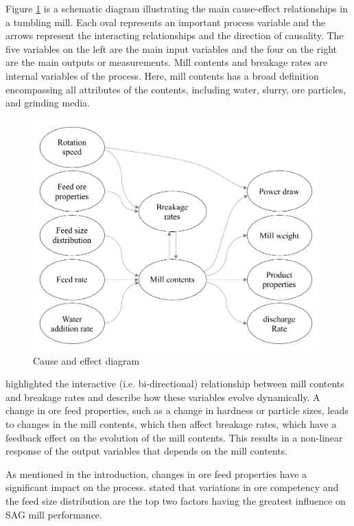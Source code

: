 Figure \ref{fig:cause-effect} is a schematic diagram illustrating the main cause-effect relationships in a tumbling mill. Each oval represents an important process variable and the arrows represent the interacting relationships and the direction of causality. The five variables on the left are the main input variables and the four on the right are the main outputs or measurements. Mill contents and breakage rates are internal variables of the process. Here, mill contents has a broad definition encompassing all attributes of the contents, including water, slurry, ore particles, and grinding media.
\begin{figure}[htp]
	\centering
	\includegraphics[width=11cm]{images/cause-effect.pdf}
	\caption{Cause and effect diagram} \label{fig:cause-effect}
\end{figure}

\cite{powell_applying_2009} highlighted the interactive (i.e. bi-directional) relationship between mill contents and breakage rates and describe how these variables evolve dynamically. A change in ore feed properties, such as a change in hardness or particle sizes, leads to changes in the mill contents, which then affect breakage rates, which have a feedback effect on the evolution of the mill contents. This results in a non-linear response of the output variables that depends on the mill contents.

As mentioned in the introduction, changes in ore feed properties have a significant impact on the process. \cite{morrell_influence_2001} stated that variations in ore competency and the feed size distribution are the top two factors having the greatest influence on \acrshort{SAG} mill performance.


